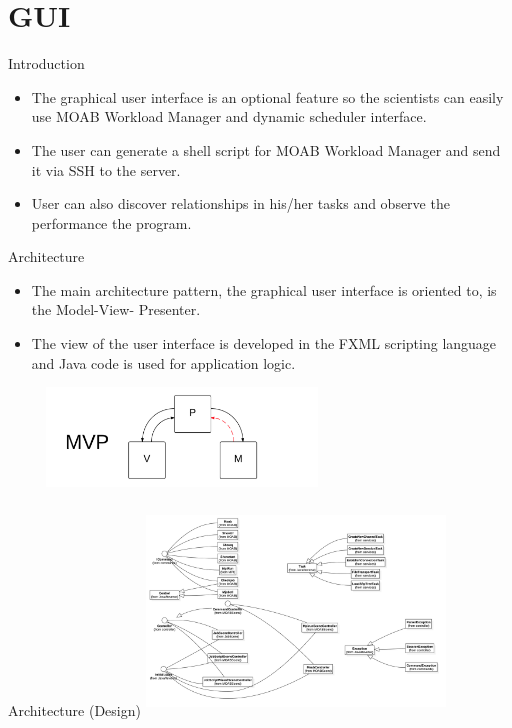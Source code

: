 \section{GUI}
	\begin{frame}{Introduction}
		\begin{itemize}
			\pause
			\item The graphical user interface is an optional feature so the scientists can easily use MOAB Workload Manager and dynamic scheduler interface. 
			\pause
			\item The user can generate a shell script for MOAB Workload Manager and send it via SSH to the server.
			\pause
			\item User can also discover relationships in his/her tasks and observe the performance the program. 
			
		\end{itemize}
	\end{frame}
	
	\begin{frame}{Architecture}
		\begin{itemize}
			\item The main architecture pattern, the graphical user interface is oriented to, is the Model-View-
Presenter. 
	        \item The view of the user interface is developed in the FXML scripting language and Java code is used for application logic.
	        
				\includegraphics[width=300px, height=100px]{images/mvp.png}
		\end{itemize}
	\end{frame}
	\begin{frame}{Architecture (Design)}
		\includegraphics[width=300px, height=210px]{images/GUIDesign.png}
	\end{frame}
	


